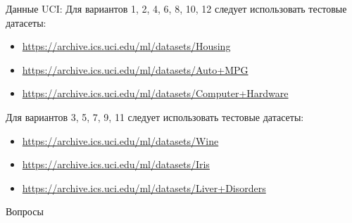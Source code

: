 \documentclass[10pt]{beamer}
\begin{document}
\begin{frame}[fragile]{Данные UCI:}
Для вариантов 1, 2, 4, 6, 8, 10, 12 следует использовать тестовые датасеты:
\begin{itemize}
    \item \url{https://archive.ics.uci.edu/ml/datasets/Housing}
    \item \url{https://archive.ics.uci.edu/ml/datasets/Auto+MPG}
    \item \url{https://archive.ics.uci.edu/ml/datasets/Computer+Hardware}
\end{itemize}

\vspace{1em}
Для вариантов 3, 5, 7, 9, 11 следует использовать тестовые датасеты:
\begin{itemize}
    \item \url{https://archive.ics.uci.edu/ml/datasets/Wine}
    \item \url{https://archive.ics.uci.edu/ml/datasets/Iris}
    \item \url{https://archive.ics.uci.edu/ml/datasets/Liver+Disorders}
\end{itemize}

\end{frame}

\begin{frame}[plain]
\begin{center}
{\Large Вопросы}
\end{center}
\end{frame}
\end{document}

